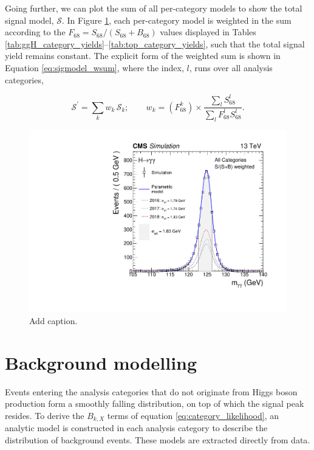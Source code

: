 Going further, we can plot the sum of all per-category models to show the total signal model, $\mathcal{S}$. In Figure \ref{fig:sigmodels_weighted}, each per-category model is weighted in the sum according to the $F_{68} = S_{68}/(S_{68}+B_{68})$ values displayed in Tables \ref{tab:ggH_category_yields}--\ref{tab:top_category_yields}, such that the total signal yield remains constant. The explicit form of the weighted sum is shown in Equation \ref{eq:sigmodel_wsum}, where the index, $l$, runs over all analysis categories,

\begin{equation}\label{eq:sigmodel_wsum}
    \mathcal{S}^' = \sum_k w_k\,\mathcal{S}_k; \qquad w_k = (F^k_{68}) \times \frac{\sum_l S^l_{68}}{\sum_l F^l_{68} S^l_{68}}.
\end{equation}

\begin{figure}[h]
  \centering
  \includegraphics[width=.8\textwidth]{Figures/hgg_stats/smodel_all_weight.pdf}
  \caption[Weighted sum of all signal models]
  {
    Add caption.
  }
  \label{fig:sigmodels_weighted}
\end{figure}

\newpage
\section{Background modelling}\label{sec:bkg_modeling}
Events entering the analysis categories that do not originate from Higgs boson production form a smoothly falling \mgg distribution, on top of which the signal peak resides. To derive the $B_{k,X}$ terms of equation \ref{eq:category_likelihood}, an analytic model is constructed in each analysis category to describe the distribution of background events. These models are extracted directly from data.

